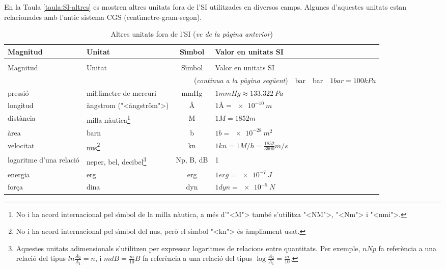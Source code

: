 En la Taula \vref{taula:SI-altres} es mostren altres unitats fora de l'SI utilitzades en diversos camps. Algunes d'aquestes unitats estan relacionades amb l'antic sistema CGS (cent\'{\i}metre-gram-segon).

\begin{longtable}[h]{llcl}
   \caption{\label{taula:SI-altres} Altres unitats fora de l'SI}\\
   \toprule[1pt]
    Magnitud & Unitat &  S\'{\i}mbol & Valor en unitats SI\\
   \midrule
   \endfirsthead
   \caption[]{Altres unitats fora de l'SI (\emph{ve de la p\`{a}gina
   anterior})}\\
   \toprule[1pt]
    Magnitud & Unitat &  S\'{\i}mbol & Valor en unitats SI\\
   \midrule
   \endhead
   \midrule
   \multicolumn{4}{r}{(\emph{continua a la p\`{a}gina seg\"{u}ent})}
   \endfoot
   \endlastfoot
    pressi\'{o} & bar & \si{bar} & $1\unit{bar} = 100\unit{kPa}$ \\
    pressi\'{o} & mi{\l.l}\'{\i}metre de mercuri & \si{mmHg} & $1\unit{mmHg} \approx \SI{133,322}{Pa}$ \\
    longitud & \`{a}ngstrom ({"<}\aa{}ngstr\"{o}m{">}) & $\si{\angstrom}$ & $1\unit{\angstrom} = \SI{e-10}{m}$\\
    dist\`{a}ncia & milla n\`{a}utica\footnote{No i ha acord internacional pel s\'{\i}mbol de la milla n\`{a}utica, a m\'{e}s d'{"<}M{">} tamb\'{e} s'utilitza {"<}NM{">}, {"<}Nm{">} i {"<}nmi{">}.} &  \si{M} & $1\unit{M} = 1852\unit{m}$ \\
    \`{a}rea & barn & \si{b} &  $1\unit{b} = \SI{e-28}{m^2}$\\
    velocitat & nus\footnote{No i ha acord internacional pel s\'{\i}mbol del nus, per\`{o} el s\'{\i}mbol {"<}kn{">} \'{e}s \`{a}mpliament usat.} & \si{kn} & $1\unit{kn} = 1\unit{M/h} = \frac{1852}{3600}\unit{m/s}$ \\
    logaritme d'una relaci\'{o} & neper, bel, decibel\footnote{Aquestes unitats adimensionals s'utilitzen per expressar logaritmes de relacions entre quantitats. Per exemple, $n\unit{Np}$ fa refer\`{e}ncia a una relaci\'{o} del tipus $ln\frac{A_2}{A_1}= n$, i  $ m \unit{dB} =\frac{m}{10}\unit{B}$  fa refer\`{e}ncia a una relaci\'{o} del tipus $\log\frac{A_2}{A_1} =\frac{m}{10}$.} & \si{Np}, \si{B}, \si{dB} & 1\\
    energia & erg & \si{erg} & $1\unit{erg} = \SI{e-7}{J} $ \\
    for\c{c}a & dina & \si{dyn} & $1\unit{dyn} = \SI{e-5}{N}$ \\

\end{longtable}
